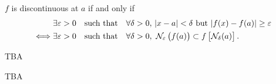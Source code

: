 \documentclass[11pt,openany]{article}
\begin{document}
\begin{remark*}
	$f$ is discontinuous at $a$ if and only if \begin{align*}
		&\exists\varepsilon>0\quad\text{such that}\quad\forall\delta>0,\ \abs{x-a}<\delta\ \text{but}\ |{f(x)-f(a)}|\geq\varepsilon\\
		\iff &\exists\varepsilon>0\quad\text{such that}\quad\forall\delta>0,\ \nbhd_\varepsilon\left(f(a)\right)\subset f\left[\nbhd_\delta(a)\right].
	\end{align*}
\end{remark*}

\newpage
\begin{note}
	TBA
\end{note}
\begin{note}
	TBA
\end{note}
\vfill
\end{document}
